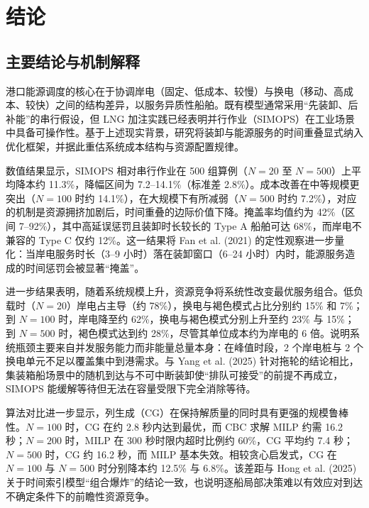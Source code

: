 \documentclass[UTF8, a4paper, 12pt]{ctexart}
\begin{document}
\section{结论}
\label{sec:conclusion}

\subsection{主要结论与机制解释}
\label{sec:main_findings}

港口能源调度的核心在于协调岸电（固定、低成本、较慢）与换电（移动、高成本、较快）之间的结构差异，以服务异质性船舶。既有模型通常采用“先装卸、后补能”的串行假设\cite{Agatz2018, Moshref2020}，但 LNG 加注实践已经表明并行作业（SIMOPS）在工业场景中具备可操作性\cite{Fan2021}。基于上述现实背景，研究将装卸与能源服务的时间重叠显式纳入优化框架，并据此重估系统成本结构与资源配置规律。

数值结果显示，SIMOPS 相对串行作业在 500 组算例（$N=20$ 至 $N=500$）上平均降本约 11.3\%，降幅区间为 7.2--14.1\%（标准差 2.8\%）。成本改善在中等规模更突出（$N=100$ 时约 14.1\%），在大规模下有所减弱（$N=500$ 时约 7.2\%），对应的机制是资源拥挤加剧后，时间重叠的边际价值下降。掩盖率均值约为 42\%（区间 7--92\%），其中高延误惩罚且装卸时长较长的 Type A 船舶可达 68\%，而岸电不兼容的 Type C 仅约 12\%。这一结果将 Fan et al. (2021) \cite{Fan2021} 的定性观察进一步量化：当岸电服务时长（3--9 小时）落在装卸窗口（6--24 小时）内时，能源服务造成的时间惩罚会被显著“掩盖”。

进一步结果表明，随着系统规模上升，资源竞争将系统性改变最优服务组合。低负载时（$N=20$）岸电占主导（约 78\%），换电与褐色模式占比分别约 15\% 和 7\%；到 $N=100$ 时，岸电降至约 62\%，换电与褐色模式分别上升至约 23\% 与 15\%；到 $N=500$ 时，褐色模式达到约 28\%，尽管其单位成本约为岸电的 6 倍。说明系统瓶颈主要来自并发服务能力而非能量总量本身：在峰值时段，2 个岸电桩与 2 个换电单元不足以覆盖集中到港需求。与 Yang et al. (2025) \cite{Yang2025_Hybrid} 针对拖轮的结论相比，集装箱船场景中的随机到达与不可中断装卸\cite{Bierwirth2010}使“排队可接受”的前提不再成立，SIMOPS 能缓解等待但无法在容量受限下完全消除等待。

算法对比进一步显示，列生成（CG）在保持解质量的同时具有更强的规模鲁棒性。$N=100$ 时，CG 在约 2.8 秒内达到最优，而 CBC 求解 MILP 约需 16.2 秒；$N=200$ 时，MILP 在 300 秒时限内超时比例约 60\%，CG 平均约 7.4 秒；$N=500$ 时，CG 约 16.2 秒，而 MILP 基本失效。相较贪心启发式，CG 在 $N=100$ 与 $N=500$ 时分别降本约 12.5\% 与 6.8\%。该差距与 Hong et al. (2025) \cite{Hong2025} 关于时间索引模型“组合爆炸”的结论一致，也说明逐船局部决策难以有效应对到达不确定条件下的前瞻性资源竞争。
\end{document}
